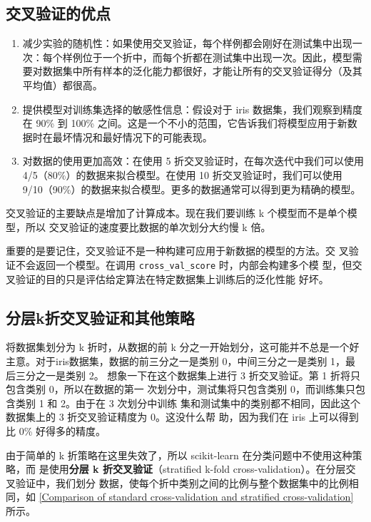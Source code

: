 \subsection{交叉验证的优点}
\begin{enumerate}
    \item 减少实验的随机性：如果使用交叉验证，每个样例都会刚好在测试集中出现一次：每个样例位于一个折中，而每个折都在测试集中出现一次。因此，模型需要对数据集中所有样本的泛化能力都很好，才能让所有的交叉验证得分（及其平均值）都很高。
    \item 提供模型对训练集选择的敏感性信息：假设对于 iris 数据集，我们观察到精度在 90\% 到 100\% 之间。这是一个不小的范围，它告诉我们将模型应用于新数据时在最坏情况和最好情况下的可能表现。
    \item 对数据的使用更加高效：在使用 5 折交叉验证时，在每次迭代中我们可以使用 4/5（80\%）的数据来拟合模型。在使用 10 折交叉验证时，我们可以使用 9/10（90\%）的数据来拟合模型。更多的数据通常可以得到更为精确的模型。
\end{enumerate}

交叉验证的主要缺点是增加了计算成本。现在我们要训练 k 个模型而不是单个模型，所以
交叉验证的速度要比数据的单次划分大约慢 k 倍。

\begin{tcolorbox}
    重要的是要记住，交叉验证不是一种构建可应用于新数据的模型的方法。交
    叉验证不会返回一个模型。在调用 \verb|cross_val_score| 时，内部会构建多个模
    型，但交叉验证的目的只是评估给定算法在特定数据集上训练后的泛化性能
    好坏。
\end{tcolorbox}
\subsection{分层k折交叉验证和其他策略}
将数据集划分为 k 折时，从数据的前 k 分之一开始划分，这可能并不总是一个好主意。对于iris数据集，数据的前三分之一是类别 0，中间三分之一是类别 1，最后三分之一是类别 2。
想象一下在这个数据集上进行 3 折交叉验证。第 1 折将只包含类别 0，所以在数据的第一
次划分中，测试集将只包含类别 0，而训练集只包含类别 1 和 2。由于在 3 次划分中训练
集和测试集中的类别都不相同，因此这个数据集上的 3 折交叉验证精度为 0。这没什么帮
助，因为我们在 iris 上可以得到比 0\% 好得多的精度。

由于简单的 k 折策略在这里失效了，所以 scikit-learn 在分类问题中不使用这种策略，而
是使用\textbf{分层 k 折交叉验证}（stratified k-fold cross-validation）。在分层交叉验证中，我们划分
数据，使每个折中类别之间的比例与整个数据集中的比例相同，如 \autoref{Comparison of standard cross-validation and stratified cross-validation} 所示。

